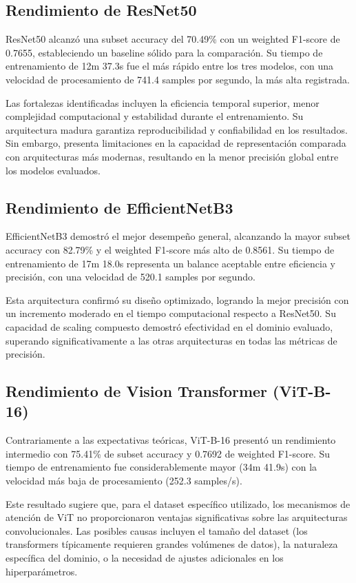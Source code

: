 \begin{table}[H]
\subsection{Rendimiento de ResNet50}

ResNet50 alcanzó una subset accuracy del 70.49\% con un weighted F1-score de 0.7655, estableciendo un baseline sólido para la comparación. Su tiempo de entrenamiento de 12m 37.3s fue el más rápido entre los tres modelos, con una velocidad de procesamiento de 741.4 samples por segundo, la más alta registrada.

Las fortalezas identificadas incluyen la eficiencia temporal superior, menor complejidad computacional y estabilidad durante el entrenamiento. Su arquitectura madura garantiza reproducibilidad y confiabilidad en los resultados. Sin embargo, presenta limitaciones en la capacidad de representación comparada con arquitecturas más modernas, resultando en la menor precisión global entre los modelos evaluados.

\subsection{Rendimiento de EfficientNetB3}

EfficientNetB3 demostró el mejor desempeño general, alcanzando la mayor subset accuracy con 82.79\% y el weighted F1-score más alto de 0.8561. Su tiempo de entrenamiento de 17m 18.0s representa un balance aceptable entre eficiencia y precisión, con una velocidad de 520.1 samples por segundo.

Esta arquitectura confirmó su diseño optimizado, logrando la mejor precisión con un incremento moderado en el tiempo computacional respecto a ResNet50. Su capacidad de scaling compuesto demostró efectividad en el dominio evaluado, superando significativamente a las otras arquitecturas en todas las métricas de precisión.

\subsection{Rendimiento de Vision Transformer (ViT-B-16)}

Contrariamente a las expectativas teóricas, ViT-B-16 presentó un rendimiento intermedio con 75.41\% de subset accuracy y 0.7692 de weighted F1-score. Su tiempo de entrenamiento fue considerablemente mayor (34m 41.9s) con la velocidad más baja de procesamiento (252.3 samples/s).

Este resultado sugiere que, para el dataset específico utilizado, los mecanismos de atención de ViT no proporcionaron ventajas significativas sobre las arquitecturas convolucionales. Las posibles causas incluyen el tamaño del dataset (los transformers típicamente requieren grandes volúmenes de datos), la naturaleza específica del dominio, o la necesidad de ajustes adicionales en los hiperparámetros.


\end{table}
